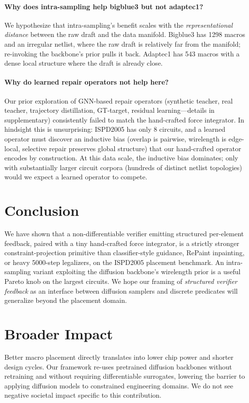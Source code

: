 \documentclass{article}
\begin{document}
\paragraph{Why does intra-sampling help bigblue3 but not adaptec1?}
We hypothesize that intra-sampling's benefit scales with the
\emph{representational distance} between the raw draft and the data manifold.
Bigblue3 has 1298 macros and an irregular netlist, where the raw draft is
relatively far from the manifold; re-invoking the backbone's prior pulls it
back.  Adaptec1 has 543 macros with a dense local structure where the draft
is already close.

\paragraph{Why do learned repair operators not help here?}  Our prior
exploration of GNN-based repair operators (synthetic teacher, real teacher,
trajectory distillation, GT-target, residual learning---details in
supplementary) consistently failed to match the hand-crafted force
integrator.  In hindsight this is unsurprising: ISPD2005 has only 8 circuits,
and a learned operator must discover an inductive bias (overlap is pairwise,
wirelength is edge-local, selective repair preserves global structure) that
our hand-crafted operator encodes by construction.  At this data scale, the
inductive bias dominates; only with substantially larger circuit corpora
(hundreds of distinct netlist topologies) would we expect a learned operator
to compete.

\section{Conclusion}

We have shown that a non-differentiable verifier emitting structured
per-element feedback, paired with a tiny hand-crafted force integrator, is
a strictly stronger constraint-projection primitive than classifier-style
guidance, RePaint inpainting, or heavy 5000-step legalizers, on the
ISPD2005 placement benchmark.  An intra-sampling variant exploiting the
diffusion backbone's wirelength prior is a useful Pareto knob on the
largest circuits.  We hope our framing of \emph{structured verifier feedback}
as an interface between diffusion samplers and discrete predicates will
generalize beyond the placement domain.

\section*{Broader Impact}
Better macro placement directly translates into lower chip power and shorter
design cycles.  Our framework re-uses pretrained diffusion backbones without
retraining and without requiring differentiable surrogates, lowering the
barrier to applying diffusion models to constrained engineering domains.
We do not see negative societal impact specific to this contribution.
\end{document}
